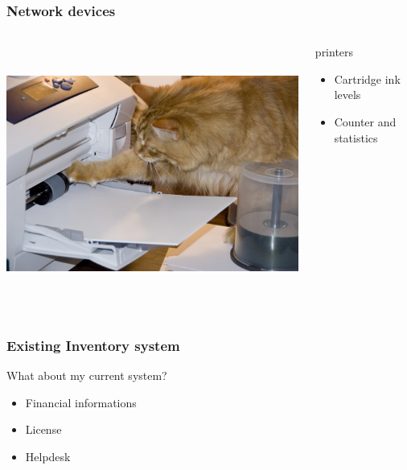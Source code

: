 \documentclass{beamer}
\begin{document}
\begin{frame}

    \frametitle{Network devices}


 \begin{columns}
 \begin{column}{0.15\textwidth}
         \includegraphics[height=8.5cm]{./pics/printer.jpg}
 \end{column}
 \begin{column}{1.25\textwidth}
    

    \begin{block}{printers}
        \begin{itemize}
            \item Cartridge ink levels
            \item Counter and statistics
        \end{itemize}
    \end{block}

 \end{column}
\end{columns}
\end{frame}



\begin{frame}




    \frametitle{Existing Inventory system}

 
    \begin{block}{What about my current system?}
        \begin{itemize}
            \item Financial informations
            \item License
            \item Helpdesk
        \end{itemize}
    \end{block}
   

\end{frame}
\end{document}
